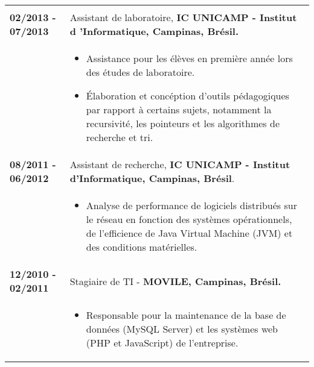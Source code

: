 \documentclass[10pt, a4paper]{article}
\begin{document}
\begin{tabular}{p{} p{}}
\begin{itemize}
\end{itemize}\\

 \textbf{02/2013 - 07/2013}   & Assistant de laboratoire, \textbf{IC UNICAMP -
 Institut d 'Informatique, Campinas, Brésil.} \\
 & \vspace{-8pt}
 \begin{itemize}
    \item Assistance pour les élèves en première année lors des études de
    laboratoire.
    \item Élaboration et concéption d'outils pédagogiques par rapport
    à certains sujets, notamment la recursivité, les pointeurs et les
    algorithmes de recherche et  tri.
\end{itemize}\\

 \textbf{08/2011 - 06/2012} & Assistant de recherche, \textbf{IC UNICAMP -
 Institut d'Informatique, Campinas, Brésil}. \\
 & \begin{itemize}
   \vspace{-8pt}
 	\item Analyse de performance de logiciels distribués sur le réseau  en
 	fonction des systèmes opérationnels, de l’efficience de Java Virtual Machine
 	(JVM) et des conditions matérielles.
 \end{itemize}
 \\
 
 
 \textbf{12/2010 - 02/2011} & Stagiaire de TI - \textbf{MOVILE, Campinas,
 Brésil.}
 \\ & \begin{itemize}
   \vspace{-8pt}
   \item Responsable pour la maintenance de la base de données
 (MySQL Server) et les systèmes web (PHP et JavaScript) de l’entreprise.
 \end{itemize}
  
\end{tabular}


% 
% 
% 

\end{document}
